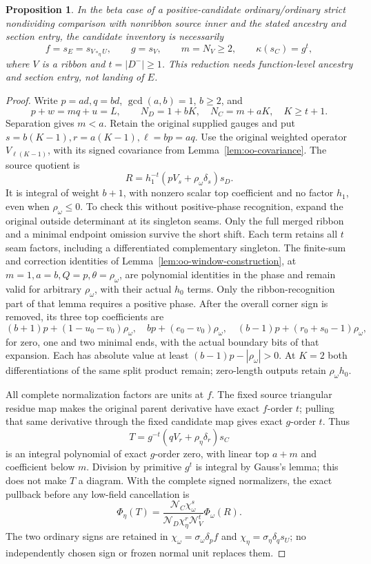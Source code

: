 \documentclass[11pt,a4paper]{amsart}
\numberwithin{equation}{section}
\theoremstyle{plain}
\newtheorem{proposition}[theorem]{Proposition}
\theoremstyle{definition}
\begin{document}
\begin{proposition}\label{prop:oo-residue-reduction}
In the beta case of a positive-candidate ordinary/ordinary strict nondividing comparison with nonribbon source inner and the stated ancestry and section entry, the candidate inventory is necessarily
\[
 f=s_E=s_{V\circ_\eta U},\qquad g=s_V,\qquad
 m=N_V\ge2,\qquad \kappa(s_C)=g^t,
\]
where \(V\) is a ribbon and \(t=|D^-|\ge1\).  This reduction needs function-level ancestry and section entry, not landing of \(E\).
\end{proposition}
\begin{proof}
Write \(p=ad,q=bd\), \(\gcd(a,b)=1\), \(b\ge2\), and
\[
 p+w=mq+u=L,\qquad N_D=1+bK,\quad N_C=m+aK,
 \quad K\ge t+1.
\]
Separation gives \(m<a\).  Retain the original supplied gauges and put \(s=b(K-1),r=a(K-1),\ell=bp=aq\).  Use the original weighted operator \(V_{\ell(K-1)}\), with its signed covariance from Lemma~\ref{lem:oo-covariance}.  The source quotient is
\[
 R=h_1^{-t}(pV_s+\rho_\omega\delta_s)s_D.
\]
It is integral of weight \(b+1\), with nonzero scalar top coefficient and no factor \(h_1\), even when \(\rho_\omega\le0\).  To check this without positive-phase recognition, expand the original outside determinant at its singleton seams.  Only the full merged ribbon and a minimal endpoint omission survive the short shift.  Each term retains all \(t\) seam factors, including a differentiated complementary singleton.  The finite-sum and correction identities of Lemma~\ref{lem:oo-window-construction}, at \(m=1,a=b,Q=p,\theta=\rho_\omega\), are polynomial identities in the phase and remain valid for arbitrary \(\rho_\omega\), with their actual \(h_0\) terms.  Only the ribbon-recognition part of that lemma requires a positive phase.  After the overall corner sign is removed, its three top coefficients are
\[
 (b+1)p+(1-u_0-v_0)\rho_\omega,\quad
 bp+(e_0-v_0)\rho_\omega,\quad
 (b-1)p+(r_0+s_0-1)\rho_\omega,
\]
for zero, one and two minimal ends, with the actual boundary bits of that expansion.  Each has absolute value at least \((b-1)p-|\rho_\omega|>0\).  At \(K=2\) both differentiations of the same split product remain; zero-length outputs retain \(\rho_\omega h_0\).

All complete normalization factors are units at \(f\).  The fixed source triangular residue map makes the original parent derivative have exact \(f\)-order \(t\); pulling that same derivative through the fixed candidate map gives exact \(g\)-order \(t\).  Thus
\[
 T=g^{-t}(qV_r+\rho_\eta\delta_r)s_C
\]
is an integral polynomial of exact \(g\)-order zero, with linear top \(a+m\) and coefficient below \(m\).  Division by primitive \(g^t\) is integral by Gauss's lemma; this does not make \(T\) a diagram.  With the complete signed normalizers, the exact pullback before any low-field cancellation is
\[
 \Phi_\eta(T)=
 \frac{\mathcal N_C\chi_\omega^s}
 {\mathcal N_D\chi_\eta^r\mathcal N_V^t}\Phi_\omega(R).
\]
The two ordinary signs are retained in \(\chi_\omega=\sigma_\omega\delta_pf\) and \(\chi_\eta=\sigma_\eta\delta_qs_U\); no independently chosen sign or frozen normal unit replaces them.


\end{proof}
\end{document}
